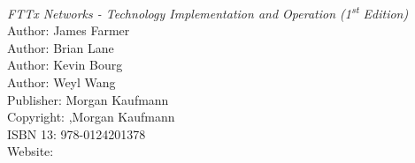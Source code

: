 
\begin{thebibliography}{9}




\emph{FTTx Networks - Technology Implementation and Operation (1\textsuperscript{st} Edition)}\\
Author: James Farmer \\
Author: Brian Lane \\
Author: Kevin Bourg \\
Author: Weyl Wang \\
Publisher: Morgan Kaufmann  \\
Copyright: \textcopyright {},Morgan Kaufmann \\
ISBN 13: 978-0124201378\\
Website: \\






\end{thebibliography}